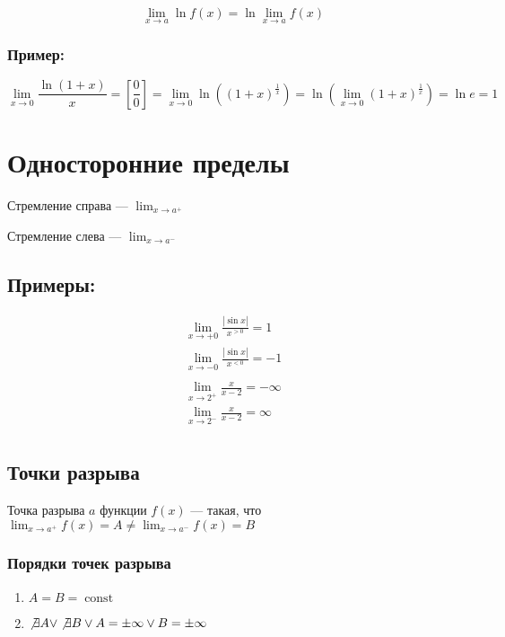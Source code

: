 \documentclass{article}
\DeclareMathOperator*{\Const}{const}
\begin{document}
\[
\lim_{x \to a} \ln{f(x)} = \ln{\lim_{x \to a} f(x)}
\]

\subsubsection*{Пример:}

\[
\lim_{x \to 0} \frac{\ln(1 + x)}{x} = \left[ \frac{0}{0} \right] =
\lim_{x \to 0} \ln \left((1 + x)^{\frac{1}{x}}\right) = 
\ln \left(\lim_{x \to 0} (1 + x)^\frac{1}{x}\right) = \ln e = 1
\]

\section{Односторонние пределы}

Стремление справа --- $\lim_{x \to a^{+}}$

Стремление слева --- $\lim_{x \to a^{-}}$

\subsection*{Примеры:}

\begin{gather*}
	\lim_{x \to +0} \frac{|\sin x|}{x^{>0}} = 1 \\
	\lim_{x \to -0} \frac{|\sin x|}{x^{<0}} = -1 \\
\end{gather*}
\begin{gather*}
	\lim_{x \to 2^{+}} \frac{x}{x-2} = -\infty \\
	\lim_{x \to 2^{-}} \frac{x}{x-2} = \infty \\
\end{gather*}

\subsection{Точки разрыва}

Точка разрыва $a$ функции $f(x)$ --- такая, что $\lim_{x \to a^+} f(x) = A \ne \lim_{x \to a^-} f(x) = B$

\subsubsection{Порядки точек разрыва}

\begin{enumerate}
	\item $A = B = \Const$
	\item $\not \exists A \lor \not \exists B \lor A = \pm \infty \lor B = \pm \infty$
\end{enumerate}
\end{document}
